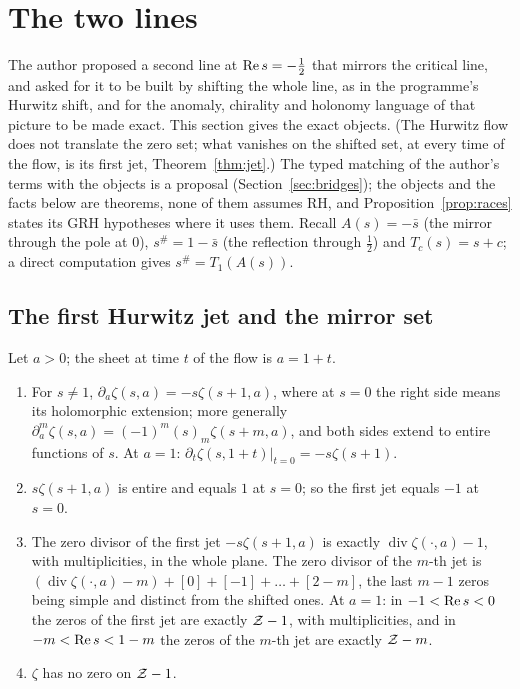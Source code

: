 \section{The two lines}\label{sec:twolines}

The author proposed a second line at $\operatorname{Re} s=-\tfrac12$ that mirrors the critical line, and asked for it to be built by shifting the whole line, as in the programme's Hurwitz shift, and for the anomaly, chirality and holonomy language of that picture to be made exact.
This section gives the exact objects. (The Hurwitz flow does not translate the zero set; what vanishes on the shifted set, at every time of the flow, is its first jet, Theorem~\ref{thm:jet}.) The typed matching of the author's terms with the objects is a proposal (Section~\ref{sec:bridges}); the objects and the facts below are theorems, none of them assumes RH, and Proposition~\ref{prop:races} states its GRH hypotheses where it uses them.
Recall $A(s)=-\bar s$ (the mirror through the pole at $0$), $s^\#=1-\bar s$ (the reflection through $\tfrac12$) and $T_c(s)=s+c$; a direct computation gives $s^\#=T_1(A(s))$.

\subsection{The first Hurwitz jet and the mirror set}

\begin{theorem}\label{thm:jet}
Let $a>0$; the sheet at time $t$ of the flow is $a=1+t$.
\begin{enumerate}[label=(\alph*)]
\item For $s\ne1$, $\partial_a\zeta(s,a)=-s\zeta(s+1,a)$, where at $s=0$ the right side means its holomorphic extension; more generally $\partial_a^m\zeta(s,a)=(-1)^m(s)_m\zeta(s+m,a)$, and both sides extend to entire functions of $s$. At $a=1$: $\partial_t\zeta(s,1+t)|_{t=0}=-s\zeta(s+1)$.
\item $s\zeta(s+1,a)$ is entire and equals $1$ at $s=0$; so the first jet equals $-1$ at $s=0$.
\item The zero divisor of the first jet $-s\zeta(s+1,a)$ is exactly $\operatorname{div}\zeta(\cdot,a)-1$, with multiplicities, in the whole plane. The zero divisor of the $m$-th jet is $(\operatorname{div}\zeta(\cdot,a)-m)+[0]+[-1]+\dots+[2-m]$, the last $m-1$ zeros being simple and distinct from the shifted ones. At $a=1$: in $-1<\operatorname{Re} s<0$ the zeros of the first jet are exactly $\mathcal{Z}-1$, with multiplicities, and in $-m<\operatorname{Re} s<1-m$ the zeros of the $m$-th jet are exactly $\mathcal{Z}-m$.
\item $\zeta$ has no zero on $\mathcal{Z}-1$.
\end{enumerate}
\end{theorem}


